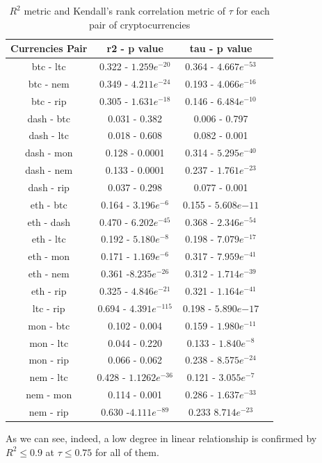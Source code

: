 \documentclass[12pt,twoside]{article}
\newcommand{\head}[1]{\textnormal{\textbf{#1}}}
\begin{document}
\begin{table}[H]
\begin{tabular}{cccc}
\hline
\head{Currencies Pair} & \head{r2 - p value} & \head{tau - p value} \\
\hline
btc - ltc & 0.322 - $1.259e^{-20}$ & 0.364 - $4.667e^{-53}$\\
btc - nem & 0.349 - $4.211e^{-24}$ & 0.193 - $4.066e^{-16}$\\
btc - rip & 0.305 - $1.631e^{-18}$ & 0.146 - $6.484e^{-10}$\\
dash - btc & 0.031 - 0.382 & 0.006 - 0.797\\
dash - ltc & 0.018 - 0.608 & 0.082 - 0.001\\
dash - mon & 0.128 - 0.0001 & 0.314 - $5.295e^{-40}$\\
dash - nem & 0.133 - 0.0001 & 0.237 - $1.761e^{-23}$\\
dash - rip & 0.037 - 0.298 & 0.077 - 0.001\\
eth - btc & 0.164 - $3.196e^{-6}$ & 0.155 - $5.608e{-11}$\\
eth - dash & 0.470 - $6.202e^{-45}$ & 0.368 - $2.346e^{-54}$\\
eth - ltc & 0.192 - $5.180e^{-8}$ & 0.198 - $7.079e^{-17}$\\
eth - mon & 0.171 - $1.169e^{-6}$ & 0.317 - $7.959e^{-41}$\\
eth - nem & 0.361 -$8.235e^{-26}$ & 0.312 - $1.714e^{-39}$\\
eth - rip & 0.325 - $4.846e^{-21}$ & 0.321 - $1.164e^{-41}$\\
ltc - rip & 0.694 - $4.391e^{-115}$ & 0.198 - $5.890e{-17}$\\
mon - btc & 0.102 - 0.004 & 0.159 - $1.980e^{-11}$\\
mon - ltc & 0.044 - 0.220 & 0.133 - $1.840e^{-8}$\\
mon - rip & 0.066 - 0.062 & 0.238 - $8.575e^{-24}$\\
nem - ltc & 0.428 - $1.1262e^{-36}$ & 0.121 - $3.055e^{-7}$\\
nem - mon & 0.114 - 0.001  & 0.286 - $1.637e^{-33}$\\
nem - rip & 0.630 -$4.111e^{-89}$ & 0.233 $8.714e^{-23}$\\
\hline
\end{tabular}
\caption{$R^2$  metric and Kendall's rank correlation metric of $\tau$ for each pair of cryptocurrencies}
\end{table}


\bigbreak
As we can see, indeed, a low degree in linear relationship is confirmed by $R^2 \leq 0.9$ at $\tau \leq 0.75$ for all of them.
\bigbreak
\end{document}
